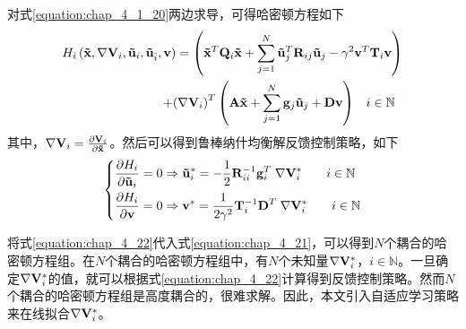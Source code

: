 对式\ref{equation:chap_4_1_20}两边求导，可得哈密顿方程如下
\begin{equation}
  \begin{gathered}
    {H_i}\left( {{\mathbf{\tilde x}},\nabla {{\mathbf{V}}_i},{{{\mathbf{\tilde u}}}_i},{{{\mathbf{\tilde u}}}_{\hat i}},{\mathbf{v}}} \right) = \left( {{{{\mathbf{\tilde x}}}^T}{{\mathbf{Q}}_i}{\mathbf{\tilde x}} + \sum\limits_{j = 1}^N {{{{\mathbf{\tilde u}}}_j}^T{{\mathbf{R}}_{ij}}{{{\mathbf{\tilde u}}}_j} - {\gamma ^2}{{\mathbf{v}}^T}{{\mathbf{T}}_i}{\mathbf{v}}} } \right) \hfill \\
    \;\;\;\;\;\;\;\;\;\;\;\;\;\;\;\;\;\;\;\;\;\;\;\;\;\;\;\;\; + {\left( {\nabla {{\mathbf{V}}_i}} \right)^T}\left( {{\mathbf{A\tilde x}} + \sum\limits_{j = 1}^N {{{\mathbf{g}}_j}{{{\mathbf{\tilde u}}}_j} + {\mathbf{Dv}}} } \right)\;\;\;i \in \mathbb{N} \hfill \\ 
  \end{gathered} 
  \label{equation:chap_4_21}
\end{equation}
其中，$\nabla {{\bf{V}}_i} = \frac{{\partial {{\bf{V}}_i}}}{{\partial {\bf{\tilde x}}}}$。然后可以得到鲁棒纳什均衡解反馈控制策略，如下
\begin{equation}
  \left\{ \begin{gathered}
    \frac{{\partial {H_i}}}{{\partial {{{\mathbf{\tilde u}}}_i}}} = 0 \Rightarrow {{{\mathbf{\tilde u}}}_i}^* =  - \frac{1}{2}{\mathbf{R}}_{ii}^{ - 1}{\mathbf{g}}_i^T\;\nabla {\mathbf{V}}_i^*\;\;\;\;\;\;\;i \in \mathbb{N} \hfill \\
    \frac{{\partial {H_i}}}{{\partial {\mathbf{v}}}} = 0 \Rightarrow {{\mathbf{v}}^*} = \frac{1}{{2{\gamma ^2}}}{\mathbf{T}}_i^{ - 1}{{\mathbf{D}}^T}\;\nabla {\mathbf{V}}_i^*\;\;\;\;\;\;\;i \in \mathbb{N} \hfill \\ 
  \end{gathered}  \right.
  \label{equation:chap_4_22}
\end{equation}

将式\ref{equation:chap_4_22}代入式\ref{equation:chap_4_21}，可以得到$N$个耦合的哈密顿方程组。在$N$个耦合的哈密顿方程组中，有$N$个未知量$\nabla {\bf{V}}_i^*$，$i \in \mathbb{N}$。一旦确定$\nabla {\bf{V}}_i^*$的值，就可以根据式\ref{equation:chap_4_22}计算得到反馈控制策略。然而$N$个耦合的哈密顿方程组是高度耦合的，很难求解。因此，本文引入自适应学习策略来在线拟合$\nabla {\bf{V}}_i^*$。

